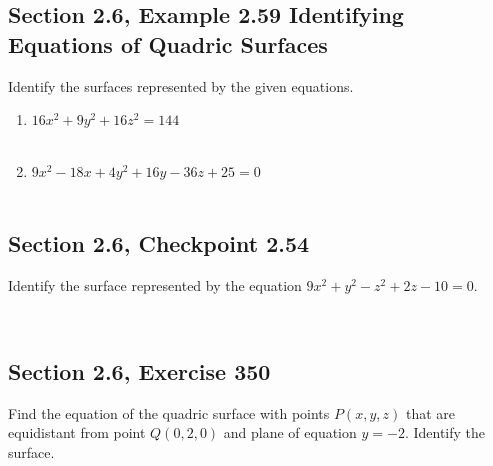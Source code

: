 \documentclass[]{mangos-musings}
\begin{document}
\subsection{Section 2.6, Example 2.59 Identifying Equations of Quadric Surfaces}
Identify the surfaces represented by the given equations.
\begin{enumerate}[label=(\alph*)]
  \item $16x^2 + 9y^2 + 16z^2 = 144$
  \begin{align*}
    \\ \\
  \end{align*}
  \item $9x^2 - 18x + 4y^2 + 16y - 36z + 25 = 0$
  \begin{align*}
    \\ \\
  \end{align*}
\end{enumerate}

\subsection{Section 2.6, Checkpoint 2.54}
Identify the surface represented by the equation $9x^2 + y^2 - z^2 + 2z - 10 = 0$.

\begin{align*}
  \\ \\
\end{align*}

\subsection{Section 2.6, Exercise 350}
Find the equation of the quadric surface with points $P(x,y,z)$ that are equidistant from point $Q(0,2,0)$ and plane of equation $y=-2$. Identify the surface. 

\end{document}
